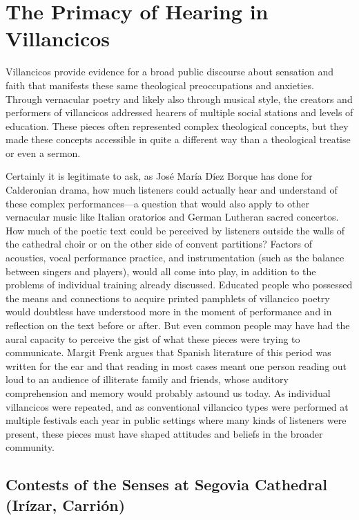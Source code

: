 \section{The Primacy of Hearing in Villancicos}

Villancicos provide evidence for a broad public discourse about sensation and
faith that manifests these same theological preoccupations and anxieties.
Through vernacular poetry and likely also through musical style, the creators
and performers of villancicos addressed hearers of multiple social stations and
levels of education.
These pieces often represented complex theological concepts, but they made these
concepts accessible in quite a different way than a theological treatise or even
a sermon.

Certainly it is legitimate to ask, as José María Díez Borque has done for
Calderonian drama, how much listeners could actually hear and understand of
these complex performances---a question that would also apply to other
vernacular music like Italian oratorios and German Lutheran sacred concertos.%
    \Autocite{DiezBorque:Publico}
How much of the poetic text could be perceived by listeners outside the walls of
the cathedral choir or on the other side of convent partitions? 
Factors of acoustics, vocal performance practice, and instrumentation (such as
the balance between singers and players), would all come into play, in addition
to the problems of individual training already discussed.  
Educated people who possessed the means and connections to acquire printed
pamphlets of villancico poetry would doubtless have understood more in the
moment of performance and in reflection on the text before or after.
But even common people may have had the aural capacity to perceive the gist of
what these pieces were trying to communicate.
Margit Frenk argues that Spanish literature of this period was written for the
ear and that reading in most cases meant one person reading out loud to an
audience of illiterate family and friends, whose auditory comprehension and
memory would probably astound us today.%
    \Autocite{Frenk:Voz}  
As individual villancicos were repeated, and as conventional villancico types
were performed at multiple festivals each year in public settings where many
kinds of listeners were present, these pieces must have shaped attitudes and
beliefs in the broader community.

\subsection{Contests of the Senses at Segovia Cathedral (Irízar, Carrión)}

